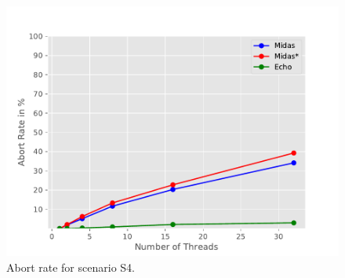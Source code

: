\begin{figure}[h!]
\begin{minipage}[l]{0.50\textwidth}
    \label{fig:eff-s4}
\end{minipage}
\begin{minipage}[l]{0.50\textwidth}
    \includegraphics[width=\textwidth]{figures/bench/ar-ll}
    \caption{Abort rate for scenario S4.}
    \label{fig:ar-s4}
\end{minipage}
\end{figure}


